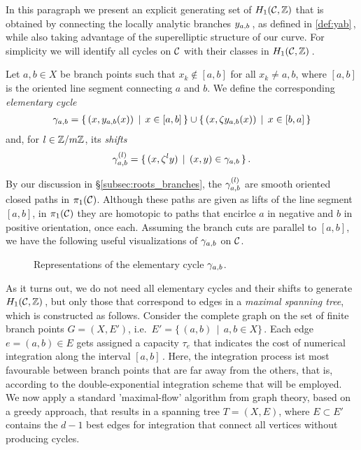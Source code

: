 \documentclass[main.tex]{subfiles}
\begin{document}
   In this paragraph we present an explicit generating set of $H_1(\mathcal{C},\mathbb{Z})$ that is obtained by connecting the locally analytic branches $y_{a,b}$\,, as defined in \eqref{def:yab}\,,
   while also taking advantage of the superelliptic structure of our curve.
   For simplicity we will identify all cycles on $\mathcal{C}$ with their classes in $H_1(\mathcal{C},\mathbb{Z})$\,.
   
   \begin{defn}\label{def:elem_cycle}
   Let $a, b \in X$ be branch points such that $x_k \not\in [a,b]$ for all $x_k \ne a,b$, where  $[a,b]$ is the oriented line segment connecting $a$ and $b$.  
   We define the corresponding \textit{elementary cycle} 
   \begin{align}
    \gamma_{a,b} = \{ \, (x,y_{a,b}(x)) \, \mid \, x \in [a,b] \, \} \cup \{ \,(x,\zeta y_{a,b}(x)) \, \mid \, x \in [b,a] \, \}
   \end{align}
   and, for $l \in \mathbb{Z}/m\mathbb{Z}$, its \textit{shifts}
   \begin{align}
    \gamma_{a,b}^{(l)} = \{ \, (x,\zeta^l y) \, \mid \, (x,y) \in \gamma_{a,b} \, \}\,. 
   \end{align}
    \end{defn}
    
   By our discussion in \S \ref{subsec:roots_branches}, the $\gamma_{a,b}^{(l)}$ are smooth oriented closed paths in $\pi_1(\mathcal{C})$. Although these paths are given as lifts of the line segment $[a,b]$, in $\pi_1(\mathcal{C})$
   they are homotopic to paths that encirlce  $a$ in negative and $b$ in positive orientation, once each.
   Assuming the branch cuts are parallel to $[a,b]$, we have the following useful visualizations of $\gamma_{a,b}$ on $\mathcal{C}$.
   \begin{figure}[H]
      \begin{center}
	  
      \end{center}
    \caption{Representations of the elementary cycle $\gamma_{a,b}$.} 
    \label{fig:elem_cycle}
\end{figure}
 
 
  As it turns out, we do not need all elementary cycles and their shifts to generate $H_1(\mathcal{C},\mathbb{Z})$\,, but only those that correspond to edges in a \emph{maximal spanning tree}, which is constructed
  as follows. \abstand
   Consider the complete graph on the set of finite branch points $G = (X,E')$, i.e.\ $E' = \{ \, (a,b) \, \mid \, a,b \in X \}$\,.
   Each edge $e = (a,b) \in E$ gets assigned a capacity $\tau_e$ that indicates the cost of numerical integration along the interval $[a,b]$\,. Here, the integration process ist most favourable
   between branch points that are far away from the others, that is, according to the double-exponential integration scheme that will be employed.
   We now apply a standard 'maximal-flow' algorithm from graph theory, based on a greedy approach, that results in a spanning tree $T = (X,E)$, where $E \subset E'$ contains the $d-1$ best edges
   for integration that connect all vertices without producing cycles.
  
\end{document}
